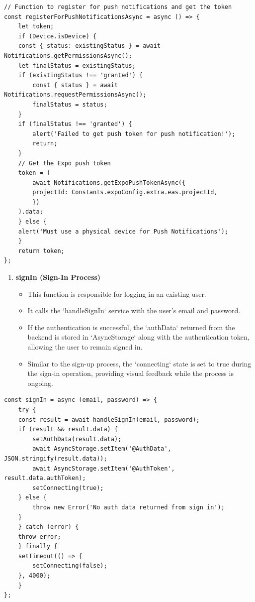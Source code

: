 \begin{lstlisting}[caption={Register Push Notification function}]
// Function to register for push notifications and get the token
const registerForPushNotificationsAsync = async () => {
    let token;
    if (Device.isDevice) {
    const { status: existingStatus } = await Notifications.getPermissionsAsync();
    let finalStatus = existingStatus;
    if (existingStatus !== 'granted') {
        const { status } = await Notifications.requestPermissionsAsync();
        finalStatus = status;
    }
    if (finalStatus !== 'granted') {
        alert('Failed to get push token for push notification!');
        return;
    }
    // Get the Expo push token
    token = (
        await Notifications.getExpoPushTokenAsync({
        projectId: Constants.expoConfig.extra.eas.projectId,
        })
    ).data;
    } else {
    alert('Must use a physical device for Push Notifications');
    }
    return token;
};
\end{lstlisting}
  

\begin{enumerate}[resume]
    \item \textbf{signIn (Sign-In Process)}
    \begin{itemize}
        \item This function is responsible for logging in an existing user.
        \item It calls the `handleSignIn` service with the user’s email and password.
        \item If the authentication is successful, the `authData` returned from the backend is stored in `AsyncStorage` along with the authentication token, allowing the user to remain signed in.
        \item Similar to the sign-up process, the `connecting` state is set to true during the sign-in operation, providing visual feedback while the process is ongoing.
    \end{itemize}
\end{enumerate}

\begin{lstlisting}[caption={Sign In Function}]
const signIn = async (email, password) => {
    try {
    const result = await handleSignIn(email, password);
    if (result && result.data) {
        setAuthData(result.data);
        await AsyncStorage.setItem('@AuthData', JSON.stringify(result.data));
        await AsyncStorage.setItem('@AuthToken', result.data.authToken);
        setConnecting(true);
    } else {
        throw new Error('No auth data returned from sign in');
    }
    } catch (error) {
    throw error;
    } finally {
    setTimeout(() => {
        setConnecting(false);
    }, 4000);
    }
};
\end{lstlisting}

